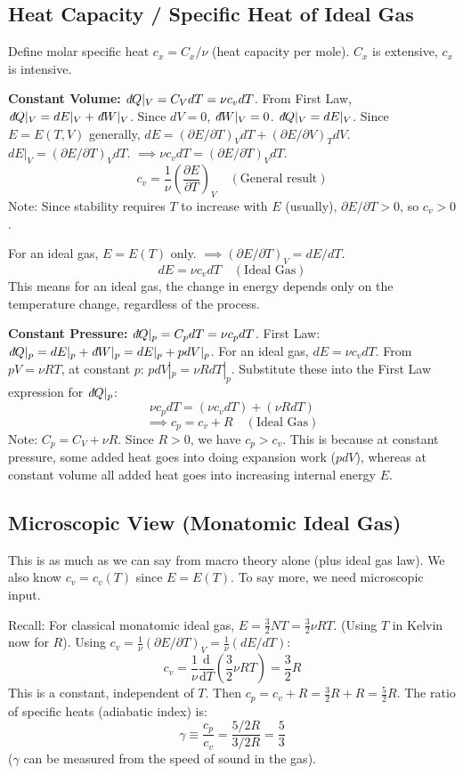 \documentclass[11pt]{article}
\newcommand{\pderiv}[2]{\frac{\partial #1}{\partial #2}}
\newcommand{\deriv}[2]{\frac{\mathrm{d} #1}{\mathrm{d} #2}}
\newcommand{\ethbar}{\text{\it{đ}}} %
\newcommand{\gasR}{R} %
\begin{document}
\subsection*{Heat Capacity / Specific Heat of Ideal Gas}

Define molar specific heat $c_x = C_x / \nu$ (heat capacity per mole). $C_x$ is extensive, $c_x$ is intensive.

\textbf{Constant Volume:}
$\ethbar Q|_V = C_V dT = \nu c_v dT$.
From First Law, $\ethbar Q|_V = dE|_V + \ethbar W|_V$. Since $dV=0$, $\ethbar W|_V = 0$.
$\ethbar Q|_V = dE|_V$. Since $E=E(T,V)$ generally, $dE = (\partial E/\partial T)_V dT + (\partial E/\partial V)_T dV$.
$dE|_V = (\partial E/\partial T)_V dT$.
$\implies \nu c_v dT = (\partial E/\partial T)_V dT$.
\[ c_v = \frac{1}{\nu} \left( \pderiv{E}{T} \right)_V \quad (\text{General result}) \]
Note: Since stability requires $T$ to increase with $E$ (usually), $\partial E / \partial T > 0$, so $c_v > 0$.

For an ideal gas, $E=E(T)$ only. $\implies (\partial E/\partial T)_V = dE/dT$.
\[ dE = \nu c_v dT \quad (\text{Ideal Gas}) \]
This means for an ideal gas, the change in energy depends only on the temperature change, regardless of the process.

\textbf{Constant Pressure:}
$\ethbar Q|_p = C_p dT = \nu c_p dT$.
First Law: $\ethbar Q|_p = dE|_p + \ethbar W|_p = dE|_p + p dV|_p$.
For an ideal gas, $dE = \nu c_v dT$.
From $pV = \nu \gasR T$, at constant $p$: $p dV|_p = \nu \gasR dT|_p$.
Substitute these into the First Law expression for $\ethbar Q|_p$:
\[ \nu c_p dT = (\nu c_v dT) + (\nu \gasR dT) \]
\[ \implies c_p = c_v + \gasR \quad (\text{Ideal Gas}) \]
Note: $C_p = C_V + \nu \gasR$. Since $R>0$, we have $c_p > c_v$. This is because at constant pressure, some added heat goes into doing expansion work ($pdV$), whereas at constant volume all added heat goes into increasing internal energy $E$.

\subsection*{Microscopic View (Monatomic Ideal Gas)}

This is as much as we can say from macro theory alone (plus ideal gas law). We also know $c_v = c_v(T)$ since $E=E(T)$. To say more, we need microscopic input.

Recall: For classical monatomic ideal gas, $E = \frac{3}{2} N T = \frac{3}{2} \nu \gasR T$. (Using $T$ in Kelvin now for $R$).
Using $c_v = \frac{1}{\nu} (\partial E / \partial T)_V = \frac{1}{\nu} (dE/dT)$:
\[ c_v = \frac{1}{\nu} \deriv{}{T} \left( \frac{3}{2} \nu \gasR T \right) = \frac{3}{2} \gasR \]
This is a constant, independent of $T$.
Then $c_p = c_v + \gasR = \frac{3}{2} \gasR + \gasR = \frac{5}{2} \gasR$.
The ratio of specific heats (adiabatic index) is:
\[ \gamma \equiv \frac{c_p}{c_v} = \frac{5/2 \gasR}{3/2 \gasR} = \frac{5}{3} \]
($\gamma$ can be measured from the speed of sound in the gas).
\end{document}
